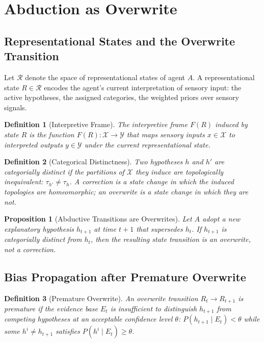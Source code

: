 \documentclass[12pt]{article}
\newtheorem{definition}{Definition}
\newtheorem{proposition}{Proposition}
\begin{document}
\section{Abduction as Overwrite}

\subsection{Representational States and the Overwrite Transition}

Let $\mathcal{R}$ denote the space of representational states of
agent $A$.
A representational state $R \in \mathcal{R}$ encodes the agent's
current interpretation of sensory input: the active hypotheses, the
assigned categories, the weighted priors over sensory signals.

\begin{definition}[Interpretive Frame]
The interpretive frame $F(R)$ induced by state $R$ is the function
$F(R) : \mathcal{X} \to \mathcal{Y}$
that maps sensory inputs $x \in \mathcal{X}$ to interpreted outputs
$y \in \mathcal{Y}$ under the current representational state.
\end{definition}

\begin{definition}[Categorical Distinctness]
\label{def:categorical-distinctness}
Two hypotheses $h$ and $h'$ are \emph{categorially distinct} if the
partitions of $\mathcal{X}$ they induce are topologically inequivalent:
$\tau_{h'} \neq \tau_h$.
A \emph{correction} is a state change in which the induced topologies
are homeomorphic; an \emph{overwrite} is a state change in which they
are not.
\end{definition}

\begin{proposition}[Abductive Transitions are Overwrites]
\label{prop:overwrite}
Let $A$ adopt a new explanatory hypothesis $h_{t+1}$ at time $t+1$
that supersedes $h_t$.
If $h_{t+1}$ is categorially distinct from $h_t$, then the resulting
state transition is an overwrite, not a correction.
\end{proposition}

\subsection{Bias Propagation after Premature Overwrite}

\begin{definition}[Premature Overwrite]
An overwrite transition $R_t \to R_{t+1}$ is premature if the evidence
base $E_t$ is insufficient to distinguish $h_{t+1}$ from competing
hypotheses at an acceptable confidence level $\theta$:
$P(h_{t+1} \mid E_t) < \theta$ while some $h^i \neq h_{t+1}$ satisfies
$P(h^i \mid E_t) \geq \theta$.
\end{definition}
\end{document}
